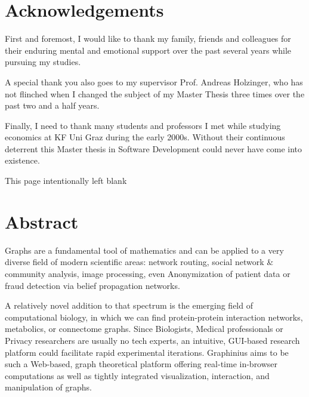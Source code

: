\pagestyle{plain}
\setcounter{page}{1}




\section*{Acknowledgements}

First and foremost, I would like to thank my family, friends and colleagues for their enduring mental and emotional support over the past several years while pursuing my studies.

A special thank you also goes to my supervisor Prof. Andreas Holzinger, who has not flinched when I changed the subject of my Master Thesis three times over the past two and a half years.

Finally, I need to thank many students and professors I met while studying economics at KF Uni Graz during the early 2000s. Without their continuous deterrent this Master thesis in Software Development could never have come into existence.


\clearpage
\begin{center}
This page intentionally left blank
\end{center}
\clearpage

\section*{Abstract}

Graphs are a fundamental tool of mathematics and can be applied to a very diverse field of modern scientific areas: network routing, social network \& community analysis, image processing, even Anonymization of patient data or fraud detection via belief propagation networks.

A relatively novel addition to that spectrum is the emerging field of computational biology, in which we can find protein-protein interaction networks, metabolics, or connectome graphs. Since Biologists, Medical professionals or Privacy researchers are usually no tech experts, an intuitive, GUI-based research platform could facilitate rapid experimental iterations. Graphinius aims to be such a Web-based, graph theoretical platform offering real-time in-browser computations as well as tightly integrated visualization, interaction, and manipulation of graphs.

